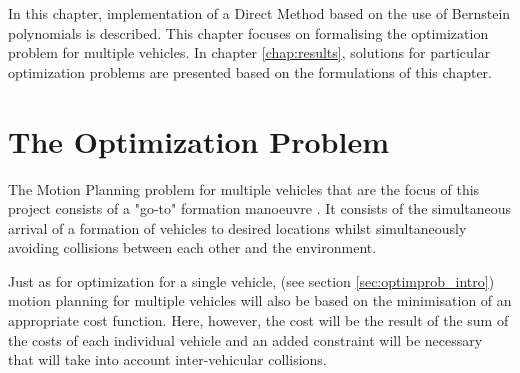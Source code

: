 \cleardoublepage
\label{chap:implementation}

\par In this chapter, implementation of a Direct Method based on the use of Bernstein polynomials is described. This chapter focuses on formalising the optimization problem for multiple vehicles. In chapter \ref{chap:results}, solutions for particular optimization problems are presented based on the formulations of this chapter.

\section{The Optimization Problem}
\label{sec:theoptproblem}

\par The Motion Planning problem for multiple vehicles that are the focus of this project consists of a "go-to" formation manoeuvre \cite{sabetghadam2018cooperative}. It consists of the simultaneous arrival of a formation of vehicles to desired locations whilst simultaneously avoiding collisions between each other and the environment.
\par Just as for optimization for a single vehicle, (see section \ref{sec:optimprob_intro}) motion planning for multiple vehicles will also be based on the minimisation of an appropriate cost function. Here, however, the cost will be the result of the sum of the costs of each individual vehicle and an added constraint will be necessary that will take into account inter-vehicular collisions. 

